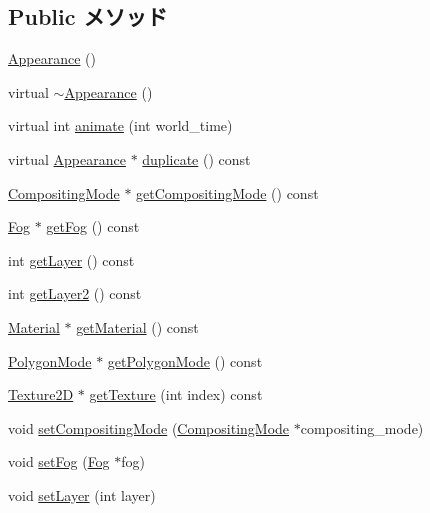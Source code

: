 \subsection*{Public メソッド}
\begin{CompactItemize}
\item 
\hyperlink{classm3g_1_1Appearance_2e594c7b96cb5cfad839a98b57f5d42f}{Appearance} ()
\item 
virtual \hyperlink{classm3g_1_1Appearance_c05c93d7a0f286cb9471b6c667ffeee1}{$\sim$Appearance} ()
\item 
virtual int \hyperlink{classm3g_1_1Appearance_8aad1ceab4c2a03609c8a42324ce484d}{animate} (int world\_\-time)
\item 
virtual \hyperlink{classm3g_1_1Appearance}{Appearance} $\ast$ \hyperlink{classm3g_1_1Appearance_ceaab703eb45cba7cf8705bc3a087127}{duplicate} () const 
\item 
\hyperlink{classm3g_1_1CompositingMode}{CompositingMode} $\ast$ \hyperlink{classm3g_1_1Appearance_e4045934febb56891c15e14486b239a8}{getCompositingMode} () const 
\item 
\hyperlink{classm3g_1_1Fog}{Fog} $\ast$ \hyperlink{classm3g_1_1Appearance_93143a921b998ff69576147a59eb44d4}{getFog} () const 
\item 
int \hyperlink{classm3g_1_1Appearance_df831e0e0ebf9d7e997150e497e6a6cf}{getLayer} () const 
\item 
int \hyperlink{classm3g_1_1Appearance_0843200b0a6a79f7753380e833a1af0c}{getLayer2} () const 
\item 
\hyperlink{classm3g_1_1Material}{Material} $\ast$ \hyperlink{classm3g_1_1Appearance_a412c7074ed5d51f6b8b6fd89275c405}{getMaterial} () const 
\item 
\hyperlink{classm3g_1_1PolygonMode}{PolygonMode} $\ast$ \hyperlink{classm3g_1_1Appearance_dd3ddcefcd18339150d281b155602886}{getPolygonMode} () const 
\item 
\hyperlink{classm3g_1_1Texture2D}{Texture2D} $\ast$ \hyperlink{classm3g_1_1Appearance_987cc21bd78d0e4e664da717479bdd57}{getTexture} (int index) const 
\item 
void \hyperlink{classm3g_1_1Appearance_8f9514f1c01268fff95b7c31f3a194b6}{setCompositingMode} (\hyperlink{classm3g_1_1CompositingMode}{CompositingMode} $\ast$compositing\_\-mode)
\item 
void \hyperlink{classm3g_1_1Appearance_bc1a612006d6b4c3d443ff6ab542c788}{setFog} (\hyperlink{classm3g_1_1Fog}{Fog} $\ast$fog)
\item 
void \hyperlink{classm3g_1_1Appearance_fbd2fbd594c8ee140b028f505631f682}{setLayer} (int layer)

\end{CompactItemize}
